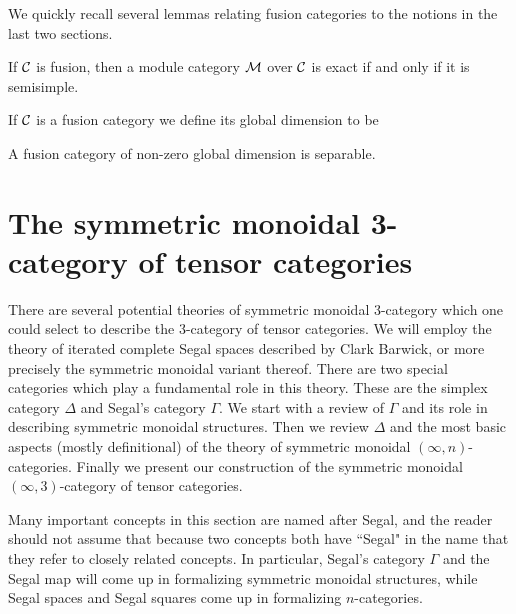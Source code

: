 \documentclass{amsart}
\begin{document}
We quickly recall several lemmas relating fusion categories to the notions in the last two sections.

\begin{lemma}
If $\mathcal C$ is fusion, then a module category $\mathcal M$ over $\mathcal C$ is exact if and only if it is semisimple.
\end{lemma}

\begin{definition}
If $\mathcal C$ is a fusion category we define its global dimension to be 
\end{definition}

\begin{proposition}
A fusion category of non-zero global dimension is separable. 
\end{proposition}



\section{The symmetric monoidal 3-category of tensor categories} \label{sec-sym-mon}



There are several potential theories of symmetric monoidal 3-category which one could select to describe the 3-category of tensor categories. We will employ the theory of iterated complete Segal spaces described by Clark Barwick,  or more precisely the symmetric monoidal variant thereof. There are two special categories which play a fundamental role in this theory. These are the simplex category $\Delta$ and Segal's category $\Gamma$. We start with a review of $\Gamma$ and its role in describing symmetric monoidal structures. Then we review $\Delta$ and the most basic aspects (mostly definitional) of the theory of symmetric monoidal $(\infty,n)$-categories. Finally we present our construction of the symmetric monoidal $(\infty,3)$-category of tensor categories. 

\begin{warning}
Many important concepts in this section are named after Segal, and the reader should not assume that because two concepts both have ``Segal" in the name that they refer to closely related concepts.  In particular, Segal's category $\Gamma$ and the Segal map will come up in formalizing symmetric monoidal structures, while Segal spaces and Segal squares come up in formalizing $n$-categories.
\end{warning}
\end{document}
